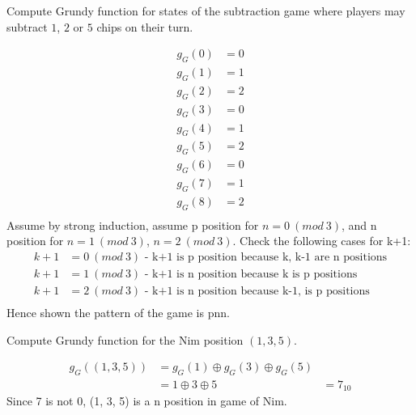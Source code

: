 \documentclass[addpoints,answers]{exam}
\begin{document}
    \pagestyle{headandfoot}
    \runningheadrule

    \firstpagefooter{}{}{}
    \runningfooter{}{}{}
    \begin{flushright}

        \vspace{0.2in}

    \end{flushright}

    \begin{questions}
        \question
            Compute Grundy function for states of the subtraction game where players may
            subtract $1$, $2$ or $5$ chips on their turn.
            \begin{solutionorbox}[\stretch{1}]
							\begin{align*}
							g_G(0) &= 0\\
							g_G(1) &= 1\\
							g_G(2) &= 2\\
							g_G(3) &= 0\\
							g_G(4) &= 1\\
							g_G(5) &= 2\\
							g_G(6) &= 0\\
							g_G(7) &= 1\\
							g_G(8) &= 2\\
							\end{align*}
								Assume by strong induction, assume p position for $n = 0\ (mod\
								3)$, and n position for
								$n = 1\ (mod\ 3)$, $n = 2\ (mod\ 3)$. Check the following cases for k+1:
							\begin{align*}
								k+1 &= 0\ (mod\ 3) \text{ - k+1 is p position because k, k-1 are n positions}\\
								k+1 &= 1\ (mod\ 3) \text{ - k+1 is n position because k is p positions}\\
								k+1 &= 2\ (mod\ 3) \text{ - k+1 is n position because k-1, is p
								positions}\\
							\end{align*}
							Hence shown the pattern of the game is pnn.
            \end{solutionorbox}
            \newpage
 
        \question
            Compute Grundy function for the Nim position $(1, 3, 5)$.
            \begin{solutionorbox}[\stretch{1}]
							\begin{align*}
								g_G((1, 3, 5)) &= g_G(1)\oplus g_G(3) \oplus g_G(5)\\
															 &= 1 \oplus 3 \oplus 5
															 &= 7_{10}
							\end{align*}
							Since 7 is not 0, (1, 3, 5) is a n position in game of Nim.
            \end{solutionorbox}
            \newpage
 

\end{questions}
\end{document}
